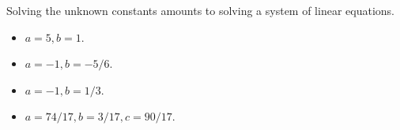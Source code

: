 \documentclass[../main.tex]{subfiles}
\begin{document}
\begin{exercise}
  \begin{solution}
    Solving the unknown constants amounts to solving a system of linear equations.

    \begin{itemize}
      \item \(a = 5, b = 1\).

      \item \(a = -1, b = -5/6\).

      \item \(a = -1, b = 1/3\).

      \item \(a = 74/17, b = 3/17, c = 90/17\).
    \end{itemize}
  \end{solution}
\end{exercise}
\end{document}

